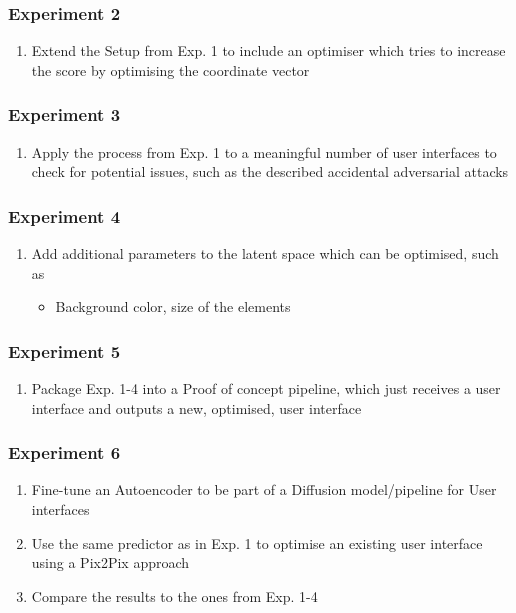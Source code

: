 \documentclass[10pt,a4paper]{scrartcl} %
\begin{document}
\subsubsection{Experiment 2}
\begin{enumerate}
    \item Extend the Setup from Exp. 1 to include an optimiser which tries to increase the score by optimising the coordinate vector
\end{enumerate}
\subsubsection{Experiment 3}
\begin{enumerate}
    \item Apply the process from Exp. 1 to a meaningful number of user interfaces to check for potential issues, such as the described accidental adversarial attacks
\end{enumerate}
\subsubsection{Experiment 4}
\begin{enumerate}
    \item Add additional parameters to the latent space which can be optimised, such as
    \begin{itemize}
        \item Background color, size of the elements
    \end{itemize}
\end{enumerate}
\subsubsection{Experiment 5}
\begin{enumerate}
    \item Package Exp. 1-4 into a Proof of concept pipeline, which just receives a user interface and outputs a new, optimised, user interface
\end{enumerate}
\subsubsection{Experiment 6}
\begin{enumerate}
    \item Fine-tune an Autoencoder to be part of a Diffusion model/pipeline for User interfaces
    \item Use the same predictor as in Exp. 1 to optimise an existing user interface using a Pix2Pix approach
    \item Compare the results to the ones from Exp. 1-4
\end{enumerate}
\
\pagebreak
\end{document}
